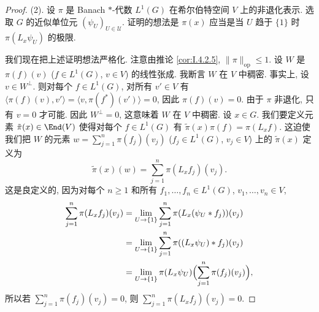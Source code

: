 \begin{proof}
(2). 设 $\pi$ 是 Banach $*$-代数 $L^1(G)$ 在希尔伯特空间 $V$ 上的非退化表示. 选取 $G$ 的近似单位元 $(\psi_U)_{U \in \mathcal{U}}$. 证明的想法是 $\pi(x)$ 应当是当 $U$ 趋于 $\{1\}$ 时 $\pi(L_x\psi_U)$ 的极限.

我们现在把上述证明想法严格化. 注意由推论 \ref{cor:I.4.2.5}, $\|\pi\|_{\mathrm{op}} \leq 1$. 设 $W$ 是 $\pi(f)(v)$ ($f \in L^1(G)$, $v \in V$) 的线性张成. 我断言 $W$ 在 $V$ 中稠密. 事实上, 设 $v \in W^{\perp}$. 则对每个 $f \in L^1(G)$, 对所有 $v' \in V$ 有 $\langle \pi(f)(v), v' \rangle = \langle v, \pi(f^*)(v') \rangle = 0$, 因此 $\pi(f)(v) = 0$. 由于 $\pi$ 非退化, 只有 $v = 0$ 才可能. 因此 $W^{\perp} = 0$, 这意味着 $W$ 在 $V$ 中稠密.
设 $x \in G$. 我们要定义元素 $\tilde{\pi}(x) \in \End(V)$ 使得对每个 $f \in L^1(G)$ 有 $\tilde{\pi}(x)\pi(f) = \pi(L_xf)$. 这迫使我们把 $W$ 的元素 $w = \sum_{j=1}^n \pi(f_j)(v_j)$ ($f_j \in L^1(G)$, $v_j \in V$) 上的 $\tilde{\pi}(x)$ 定义为
\[
\tilde{\pi}(x)(w) = \sum_{j=1}^n \pi(L_xf_j)(v_j).
\]
这是良定义的, 因为对每个 $n \geq 1$ 和所有 $f_1, \ldots, f_n \in L^1(G)$, $v_1, \ldots, v_n \in V$,
\begin{align*}
\sum_{j=1}^n \pi(L_xf_j)(v_j) &= \lim_{U \to \{1\}}\sum_{j=1}^n \pi(L_x(\psi_U * f_j))(v_j) \\
&= \lim_{U \to \{1\}}\sum_{j=1}^n \pi((L_x\psi_U) * f_j)(v_j) \\
&= \lim_{U \to \{1\}}\pi(L_x\psi_U)\Bigl(\sum_{j=1}^n \pi(f_j)(v_j)\Bigr),
\end{align*}
所以若 $\sum_{j=1}^n \pi(f_j)(v_j) = 0$, 则 $\sum_{j=1}^n \pi(L_xf_j)(v_j) = 0$.


\end{proof}

